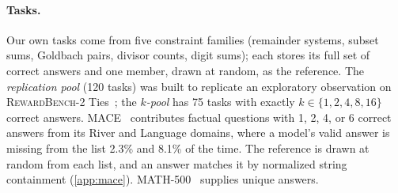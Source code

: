 \documentclass{article}
\begin{document}
\paragraph{Tasks.}
Our own tasks come from five constraint families (remainder systems, subset sums, Goldbach pairs, divisor counts, digit sums); each stores its full set of correct answers and one member, drawn at random, as the reference.
The \emph{replication pool} (120 tasks) was built to replicate an exploratory observation on \textsc{RewardBench-2} Ties~\citep{malik2025rewardbench2}; the \emph{$k$-pool} has 75 tasks with exactly $k \in \{1,2,4,8,16\}$ correct answers.
\textsc{MACE}~\citep{mace2026} contributes factual questions with 1, 2, 4, or 6 correct answers from its River and Language domains, where a model's valid answer is missing from the list 2.3\% and 8.1\% of the time.
The reference is drawn at random from each list, and an answer matches it by normalized string containment (\cref{app:mace}).
MATH-500~\citep{hendrycks2021math} supplies unique answers.
\end{document}
